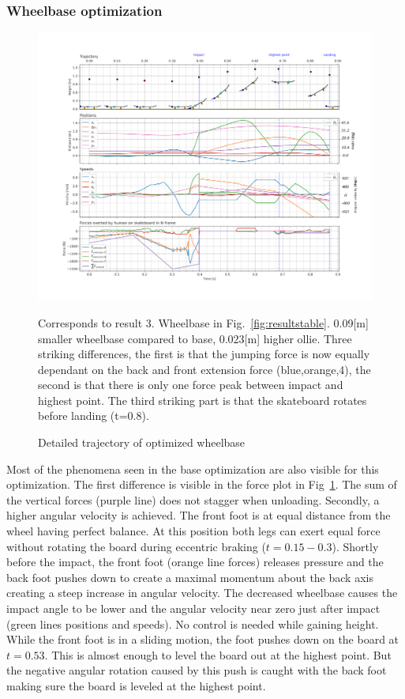 \documentclass[default,iicol]{sn-jnl}
\begin{document}
\subsubsection{Wheelbase optimization}
\begin{figure}
    \centering
    \includegraphics[trim={0cm 0cm 0cm 0cm},clip,width=\textwidth]{figure/Results/data_l_wbdpi600.png}    \vspace{-1cm}\caption[Trajectory, positions, speeds, and forces for wheelbase optimization]{Detailed trajectory of optimized wheelbase}\label{f_wheelbase}
    Corresponds to result 3. Wheelbase in Fig.~\ref{fig:resultstable}. 0.09[m] smaller wheelbase compared to base, 0.023[m] higher ollie. Three striking differences, the first is that the jumping force is now equally dependant on the back and front extension force (blue,orange,4), the second is that there is only one force peak between impact and highest point. The third striking part is that the skateboard rotates before landing (t=0.8).
\end{figure}

Most of the phenomena seen in the base optimization are also visible for this optimization. The first difference is visible in the force plot in Fig~\ref{f_wheelbase}. The sum of the vertical forces (purple line) does not stagger when unloading. Secondly, a higher angular velocity is achieved. The front foot is at equal distance from the wheel having perfect balance. At this position both legs can exert equal force without rotating the board during eccentric braking ($t=0.15 - 0.3$). Shortly before the impact, the front foot (orange line forces) releases pressure and the back foot pushes down to create a maximal momentum about the back axis creating a steep increase in angular velocity. The decreased wheelbase causes the impact angle to be lower and the angular velocity near zero just after impact (green lines positions and speeds). No control is needed while gaining height. While the front foot is in a sliding motion, the foot pushes down on the board at $t=0.53$. This is almost enough to level the board out at the highest point. But the negative angular rotation caused by this push is caught with the back foot making sure the board is leveled at the highest point.
\end{document}
